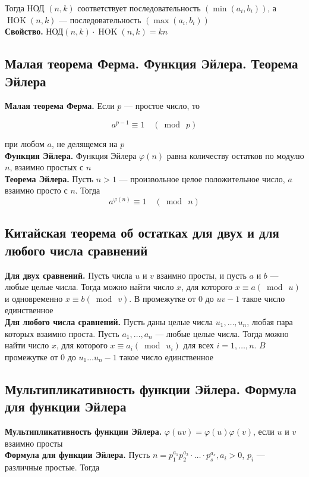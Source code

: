 \documentclass[a4paper]{article}
\begin{document}
Тогда НОД $(n, k)$ соответствует последовательность $\left(\min \left(a_{i}, b_{i}\right)\right)$, а $\operatorname{HOK}(n, k)$ — последовательность $\left(\max \left(a_{i}, b_{i}\right)\right)$\\[2mm]
\indent\textbf{Свойство.} НОД$(n, k) \cdot \operatorname{HOK}(n, k)=k n$

\subsection{Малая теорема Ферма. Функция Эйлера. Теорема Эйлера}
\textbf{Малая теорема Ферма.}  Если $p$ — простое число, то

$$
a^{p-1} \equiv 1 \quad(\bmod\ p)
$$

при любом $a$, не делящемся на $p$\\[2mm]
\indent\textbf{Функция Эйлера.} Функция Эйлера $\varphi(n)$ равна количеству остатков по модулю $n$, взаимно простых с $n$\\[2mm]
\indent\textbf{Теорема Эйлера.} Пусть $n > 1$ — произвольное целое положительное число, $a$ взаимно просто с $n$. Тогда
$$a^{\varphi(n)}\equiv 1\quad (\bmod\ n)$$

\subsection{Китайская теорема об остатках для двух и для любого числа сравнений}
\textbf{Для двух сравнений.} Пусть числа $u$ и $v$ взаимно просты, и пусть $a$ и $b$ — любые целые числа. Тогда можно найти число $x$, для которого $x \equiv a(\bmod\ u)$ и одновременно $x \equiv b(\bmod\ v)$. В промежутке от 0 до $uv -1$ такое число единственное\\[2mm]
\indent\textbf{Для любого числа сравнений.} Пусть даны целые числа $u_{1}, \ldots, u_{n}$, любая пара которых взаимно проста. Пусть $a_{1}, \ldots, a_{n}$ — любые целые числа. Тогда можно найти число $x$, для которого $x \equiv a_{i}\left(\bmod\ u_{i}\right)$ для всех $i=1, \ldots, n$. $B$ промежутке от 0 до $u_{1} \ldots u_{n}-1$ такое число единственное


\subsection{Мультипликативность функции Эйлера. Формула для функции Эйлера}
\textbf{Мультипликативность функции Эйлера.} $\varphi(uv) = \varphi(u)\varphi(v)$, если $u$ и $v$ взаимно просты\\[2mm]
\indent\textbf{Формула для функции Эйлера.} Пусть $n=p_{1}^{a_{1}} p_{2}^{a_{2}} \cdot \ldots \cdot p_{s}^{a_{s}}, a_{i}>0$, $p_{i}$ — различные простые. Тогда
\end{document}
